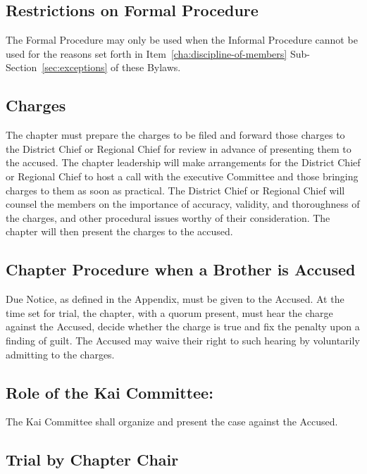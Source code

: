 \subsection{Restrictions on Formal Procedure}

The Formal Procedure may only be used when the Informal Procedure cannot be
used for the reasons set forth in Item~\ref{cha:discipline-of-members}
Sub-Section~\ref{sec:exceptions} of these Bylaws.

\subsection{Charges}

The chapter must prepare the charges to be filed and forward those charges to
the District Chief or Regional Chief for review in advance of presenting them
to the accused.
The chapter leadership will make arrangements for the District Chief or
Regional Chief to host a call with the executive Committee and those bringing
charges to them as soon as practical.
The District Chief or Regional Chief will counsel the members on the importance
of accuracy, validity, and thoroughness of the charges, and other procedural
issues worthy of their consideration.
The chapter will then present the charges to the accused.

\subsection{Chapter Procedure when a Brother is Accused}

Due Notice, as defined in the Appendix, must be given to the Accused.
At the time set for trial, the chapter, with a quorum present, must hear the
charge against the Accused, decide whether the charge is true and fix the
penalty upon a finding of guilt.
The Accused may waive their right to such hearing by voluntarily admitting to
the charges.

\subsection{Role of the Kai Committee:} %

The Kai Committee shall organize and present the case against the Accused.

\subsection{Trial by Chapter Chair}

